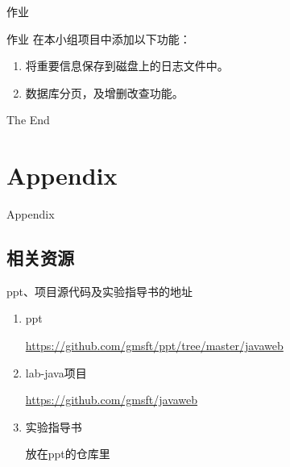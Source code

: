 \documentclass{beamer}
\begin{document}
\begin{frame}
\Huge{\centerline{作业}}
\end{frame}
\begin{frame}{作业}
在本小组项目中添加以下功能：
\begin{enumerate}
\item
将重要信息保存到磁盘上的日志文件中。
\item
数据库分页，及增删改查功能。
\end{enumerate}
\end{frame}
\begin{frame}
\Huge{\centerline{The End}}
\end{frame}

\section{Appendix}

\begin{frame}
\Huge{\centerline{Appendix}}
\end{frame}

\subsection{相关资源}
\begin{frame}
\begin{block}{ppt、项目源代码及实验指导书的地址}
\begin{enumerate}
\item
ppt

\url{https://github.com/gmsft/ppt/tree/master/javaweb}
\item
lab-java项目

\url{https://github.com/gmsft/javaweb}

\item
实验指导书

放在ppt的仓库里
\end{enumerate}
\end{block}
\end{frame}



\end{document}
